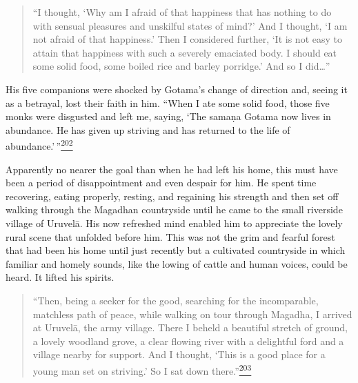 \begin{quote}
``I thought, `Why am I afraid of that happiness that has nothing to do
with sensual pleasures and unskilful states of mind?' And I thought, `I
am not afraid of that happiness.' Then I considered further, `It is not
easy to attain that happiness with such a severely emaciated body. I
should eat some solid food, some boiled rice and barley porridge.' And
so I did\ldots''
\end{quote}

His five companions were shocked by Gotama's change of direction and,
seeing it as a betrayal, lost their faith in him. ``When I ate some
solid food, those five monks were disgusted and left me, saying, `The
samaṇa Gotama now lives in abundance. He has given up striving and has
returned to the life of
abundance.'\,''\label{footprints_split_009.html_fnref202}\hyperref[footprints_split_024.htmlux5cux23fn202]{\textsuperscript{202}}

Apparently no nearer the goal than when he had left his home, this must
have been a period of disappointment and even despair for him. He spent
time recovering, eating properly, resting, and regaining his strength
and then set off walking through the Magadhan countryside until he came
to the small riverside village of Uruvelā. His now refreshed mind
enabled him to appreciate the lovely rural scene that unfolded before
him. This was not the grim and fearful forest that had been his home
until just recently but a cultivated countryside in which familiar and
homely sounds, like the lowing of cattle and human voices, could be
heard. It lifted his spirits.

\begin{quote}
``Then, being a seeker for the good, searching for the incomparable,
matchless path of peace, while walking on tour through Magadha, I
arrived at Uruvelā, the army village. There I beheld a beautiful stretch
of ground, a lovely woodland grove, a clear flowing river with a
delightful ford and a village nearby for support. And I thought, `This
is a good place for a young man set on striving.' So I sat down
there.''\label{footprints_split_009.html_fnref203}\hyperref[footprints_split_024.htmlux5cux23fn203]{\textsuperscript{203}}
\end{quote}

